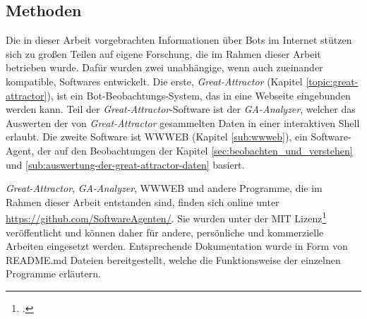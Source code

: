 \subsection{Methoden}
\label{sub:forschung_methoden}

Die in dieser Arbeit vorgebrachten Informationen über Bots im Internet stützen
sich zu großen Teilen auf eigene Forschung, die im Rahmen dieser Arbeit
betrieben wurde. Dafür wurden zwei unabhängige, wenn auch zueinander
kompatible, Softwares entwickelt. Die erste, \emph{Great-Attractor} (Kapitel
\ref{topic:great-attractor}), ist ein Bot-Beobachtungs-System, das in eine
Webseite eingebunden werden kann. Teil der \emph{Great-Attractor}-Software ist
der \emph{GA-Analyzer}, welcher das Auswerten der von \emph{Great-Attractor}
gesammelten Daten in einer interaktiven Shell erlaubt. Die zweite Software ist
WWWEB (Kapitel \ref{sub:wwweb}), ein Software-Agent, der auf den Beobachtungen
der Kapitel \ref{sec:beobachten_und_verstehen} und
\ref{sub:auswertung-der-great-attractor-daten} basiert.

\emph{Great-Attractor}, \emph{GA-Analyzer}, WWWEB und andere Programme, die im
Rahmen dieser Arbeit entstanden sind, finden sich online unter
\url{https://github.com/SoftwareAgenten/}. Sie wurden unter der MIT
Lizenz\footcite{license:MIT} veröffentlicht und können daher für andere,
persönliche und kommerzielle Arbeiten eingesetzt werden. Entsprechende
Dokumentation wurde in Form von README.md Dateien bereitgestellt, welche die
Funktionsweise der einzelnen Programme erläutern.
